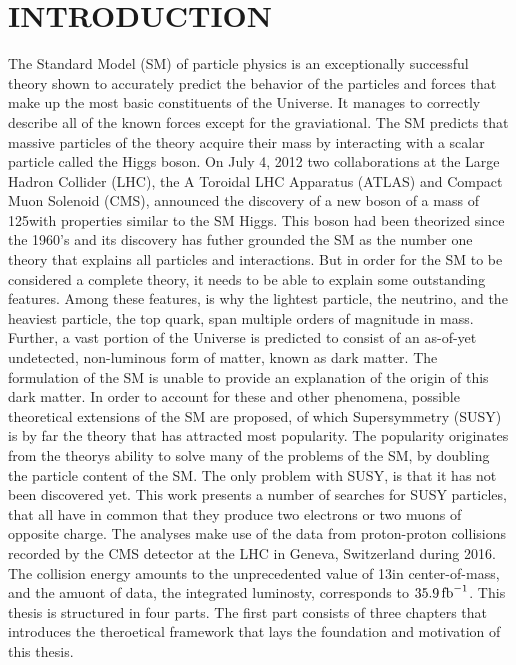 \chapter{INTRODUCTION} \label{intro}
\noindent\justify
The Standard Model (SM) of particle physics is an exceptionally successful theory shown to accurately predict the behavior of the particles and forces that make up the most basic constituents of the Universe. 
It manages to correctly describe all of the known forces except for the graviational. 
The SM predicts that massive particles of the theory acquire their mass by interacting with a scalar particle called the Higgs boson. 
On July 4, 2012 two collaborations at the Large Hadron Collider (LHC), the A Toroidal LHC Apparatus (ATLAS) and Compact Muon Solenoid (CMS), announced the discovery of a new boson of a mass of 125\GeV with properties similar to the SM Higgs. 
This boson had been theorized since the 1960's and its discovery has futher grounded the SM as the number one theory that explains all particles and interactions. 
\newpara
\noindent\justify
But in order for the SM to be considered a complete theory, it needs to be able to explain some outstanding features. 
Among these features, is why the lightest particle, the neutrino, and the heaviest particle, the top quark, span multiple orders of magnitude in mass. 
Further, a vast portion of the Universe is predicted to consist of an as-of-yet undetected, non-luminous form of matter, known as dark matter. 
The formulation of the SM is unable to provide an explanation of the origin of this dark matter.  
In order to account for these and other phenomena, possible theoretical extensions of the SM are proposed, of which Supersymmetry (SUSY) is by far the theory that has attracted most popularity. 
The popularity originates from the theorys ability to solve many of the problems of the SM, by doubling the particle content of the SM. 
The only problem with SUSY, is that it has not been discovered yet. 
\newpara
\noindent\justify
This work presents a number of searches for SUSY particles, that all have in common that they produce two electrons or two muons of opposite charge. 
The analyses make use of the data from proton-proton collisions recorded by the CMS detector at the LHC in Geneva, Switzerland during 2016. 
The collision energy amounts to the unprecedented value of 13\TeV in center-of-mass, and the amuont of data, the integrated luminosty, corresponds to $35.9\mbox{\ensuremath{\,\text{fb}^\text{$-$1}}}$.   
\newpara
\noindent\justify
This thesis is structured in four parts. 
The first part consists of three chapters that introduces the theroetical framework that lays the foundation and motivation of this thesis. 
